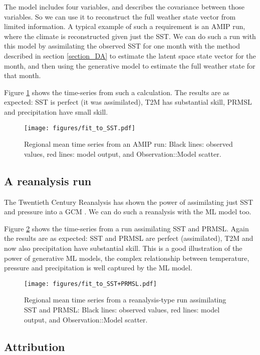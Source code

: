\documentclass[gmd,manuscript]{copernicus}
\begin{document}
The model includes four variables, and describes the covariance between those variables. So we can use it to reconstruct the full weather state vector from limited information. A typical example of such a requirement is an AMIP run, where the climate is reconstructed given just the SST. We can do such a run with this model by assimilating the observed SST for one month with the method described in section \ref{section_DA} to estimate the latent space state vector for the month, and then using the generative model to estimate the full weather state for that month.

Figure \ref{fit_to_SST} shows the time-series from such a calculation. The results are as expected: SST is perfect (it was assimilated), T2M has substantial skill, PRMSL and precipitation have small skill.

\begin{figure}[h]
\texttt{[image: figures/fit\_to\_SST.pdf]}
\caption{Regional mean time series from an AMIP run: Black lines: observed values, red lines: model output, and Observation::Model scatter.}
\label{fit_to_SST}
\end{figure}
    
\subsection{A reanalysis run}

The Twentieth Century Reanalysis has shown the power of assimilating just SST and pressure into a GCM \citep{slivinski_20crv3.1}. We can do such a reanalysis with the ML model too.

Figure \ref{fit_to_SST+PRMSL} shows the time-series from a run assimilating SST and PRMSL. Again the results are as expected: SST and PRMSL are perfect (assimilated), T2M and now also precipitation have substantial skill. This is a good illustration of the power of generative ML models, the complex relationship between temperature, pressure and precipitation is well captured by the ML model.

\begin{figure}[h]
\texttt{[image: figures/fit\_to\_SST+PRMSL.pdf]}
\caption{Regional mean time series from a reanalysis-type run assimilating SST and PRMSL: Black lines: observed values, red lines: model output, and Observation::Model scatter.}
\label{fit_to_SST+PRMSL}
\end{figure}

\subsection{Attribution}
\end{document}
